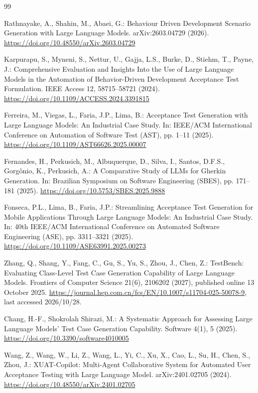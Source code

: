 \begin{thebibliography}{99}
\raggedright

Rathnayake, A., Shahin, M., Abaei, G.: Behaviour Driven Development Scenario Generation with Large Language Models. arXiv:2603.04729 (2026). \url{https://doi.org/10.48550/arXiv.2603.04729}

Karpurapu, S., Myneni, S., Nettur, U., Gajja, L.S., Burke, D., Stiehm, T., Payne, J.: Comprehensive Evaluation and Insights Into the Use of Large Language Models in the Automation of Behavior-Driven Development Acceptance Test Formulation. IEEE Access 12, 58715--58721 (2024). \url{https://doi.org/10.1109/ACCESS.2024.3391815}

Ferreira, M., Viegas, L., Faria, J.P., Lima, B.: Acceptance Test Generation with Large Language Models: An Industrial Case Study. In: IEEE/ACM International Conference on Automation of Software Test (AST), pp. 1--11 (2025). \url{https://doi.org/10.1109/AST66626.2025.00007}

Fernandes, H., Perkusich, M., Albuquerque, D., Silva, I., Santos, D.F.S., Gorg\^{o}nio, K., Perkusich, A.: A Comparative Study of LLMs for Gherkin Generation. In: Brazilian Symposium on Software Engineering (SBES), pp. 171--181 (2025). \url{https://doi.org/10.5753/SBES.2025.9888}

Fonseca, P.L., Lima, B., Faria, J.P.: Streamlining Acceptance Test Generation for Mobile Applications Through Large Language Models: An Industrial Case Study. In: 40th IEEE/ACM International Conference on Automated Software Engineering (ASE), pp. 3311--3321 (2025). \url{https://doi.org/10.1109/ASE63991.2025.00273}

Zhang, Q., Shang, Y., Fang, C., Gu, S., Yu, S., Zhou, J., Chen, Z.: TestBench: Evaluating Class-Level Test Case Generation Capability of Large Language Models. Frontiers of Computer Science 21(6), 2106202 (2027), published online 13 October 2025. \url{https://journal.hep.com.cn/fcs/EN/10.1007/s11704-025-50078-9}, last accessed 2026/10/28.

Chang, H.-F., Shokrolah Shirazi, M.: A Systematic Approach for Assessing Large Language Models' Test Case Generation Capability. Software 4(1), 5 (2025). \url{https://doi.org/10.3390/software4010005}

Wang, Z., Wang, W., Li, Z., Wang, L., Yi, C., Xu, X., Cao, L., Su, H., Chen, S., Zhou, J.: XUAT-Copilot: Multi-Agent Collaborative System for Automated User Acceptance Testing with Large Language Model. arXiv:2401.02705 (2024). \url{https://doi.org/10.48550/arXiv.2401.02705}


\end{thebibliography}
